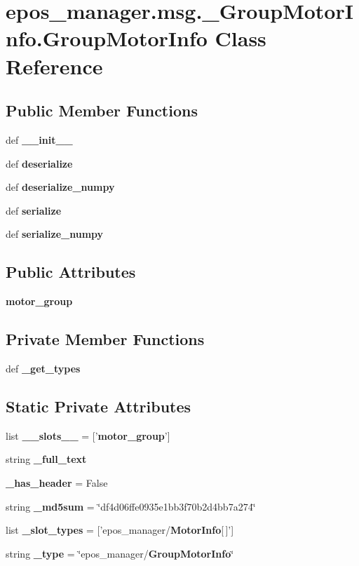 \section{epos\-\_\-manager.\-msg.\-\_\-\-Group\-Motor\-Info.\-Group\-Motor\-Info \-Class \-Reference}
\label{classepos__manager_1_1msg_1_1__GroupMotorInfo_1_1GroupMotorInfo}
\subsection*{\-Public \-Member \-Functions}
\begin{DoxyCompactItemize}
\item 
def {\bf \-\_\-\-\_\-init\-\_\-\-\_\-}
\item 
def {\bf deserialize}
\item 
def {\bf deserialize\-\_\-numpy}
\item 
def {\bf serialize}
\item 
def {\bf serialize\-\_\-numpy}
\end{DoxyCompactItemize}
\subsection*{\-Public \-Attributes}
\begin{DoxyCompactItemize}
\item 
{\bf motor\-\_\-group}
\end{DoxyCompactItemize}
\subsection*{\-Private \-Member \-Functions}
\begin{DoxyCompactItemize}
\item 
def {\bf \-\_\-get\-\_\-types}
\end{DoxyCompactItemize}
\subsection*{\-Static \-Private \-Attributes}
\begin{DoxyCompactItemize}
\item 
list {\bf \-\_\-\-\_\-slots\-\_\-\-\_\-} = ['{\bf motor\-\_\-group}']
\item 
string {\bf \-\_\-full\-\_\-text}
\item 
{\bf \-\_\-has\-\_\-header} = \-False
\item 
string {\bf \-\_\-md5sum} = \char`\"{}df4d06ffe0935e1bb3f70b2d4bb7a274\char`\"{}
\item 
list {\bf \-\_\-slot\-\_\-types} = ['epos\-\_\-manager/{\bf \-Motor\-Info}[$\,$]']
\item 
string {\bf \-\_\-type} = \char`\"{}epos\-\_\-manager/{\bf \-Group\-Motor\-Info}\char`\"{}
\end{DoxyCompactItemize}


